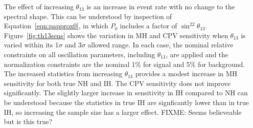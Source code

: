 \documentclass[letterpaper,11pt]{article}
\begin{document}
%
The effect of increasing $\theta_{13}$ is an increase in event rate with no change
to the spectral shape. This can be understood by inspection of 
Equation~\ref{eqn:papprox0}, in which $P_0$ includes a factor of $\sin^22\theta_{13}$.
Figure~\ref{fig:th13sens} shows the variation in MH and CPV sensitivity when $\theta_{13}$
is varied within its 1$\sigma$ and 3$\sigma$ allowed range. In each case, the 
nominal relative constraints on all oscillation parameters, including $\theta_{13}$, 
are applied and the normalization constraints are the nominal
1\% for signal and 5\% for background. The increased statistics from increasing
$\theta_{13}$ provides a modest increase in MH sensitivity for both true NH and IH.
The CPV sensitivity does not improve significantly. The slightly larger increase in
sensitivity in IH compared to NH can be understood because the statistics in true IH
are signficantly lower than in true IH, so increasing the sample size has a larger effect.
FIXME: Seems believeable but is this true?
%
\end{document}
